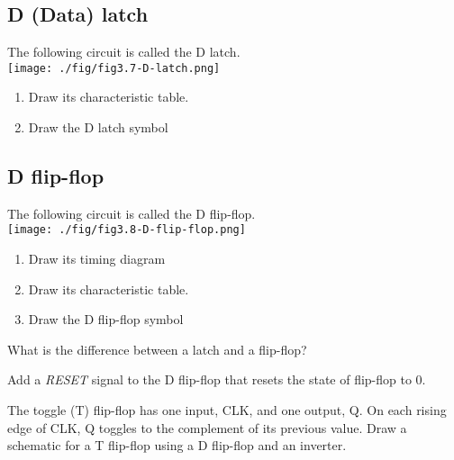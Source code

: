 \subsection{D (Data) latch \cite[Sec~3.2.2]{harris2022digital}}

\begin{definition}[D latch]
  The following circuit is called the D latch. \\
  \texttt{[image: ./fig/fig3.7-D-latch.png]} \\
  \begin{enumerate}
  \item Draw its characteristic table.
  \item Draw the D latch symbol
  \end{enumerate}
\end{definition}
\vspace{20em}

\subsection{D flip-flop \cite[Sec~3.2.2]{harris2022digital}}

\begin{definition}
  The following circuit is called the D flip-flop. \\
  \texttt{[image: ./fig/fig3.8-D-flip-flop.png]} \\
  \begin{enumerate}
  \item Draw its timing  diagram
  \item Draw its characteristic table.
  \item Draw the D flip-flop symbol
  \end{enumerate}
\end{definition}
\vspace{20em}

\begin{remark}
  What is the difference between a latch and a flip-flop?
\end{remark}
\vspace{5em}

\begin{example}
  Add a \emph{RESET} signal to the D flip-flop that resets the state of flip-flop to 0.
\end{example}
\vspace{20em}

\begin{example}
  The toggle (T) flip-flop has one input, CLK, and one output, Q. On
  each rising edge of CLK, Q toggles to the complement of its previous value. Draw
  a schematic for a T flip-flop using a D flip-flop and an inverter.
\end{example}
\vspace{20em}

